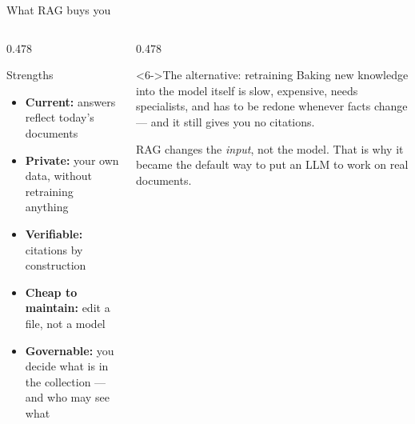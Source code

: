 \documentclass[aspectratio=169,11pt]{beamer}
\begin{document}
\begin{frame}{What RAG buys you}
  \begin{columns}[T,onlytextwidth]
    \begin{column}{0.478\textwidth}
      \begin{exampleblock}{Strengths}
        \begin{itemize}[<+->]
          \item \textbf{Current:} answers reflect today's documents
          \item \textbf{Private:} your own data, without retraining anything
          \item \textbf{Verifiable:} citations by construction
          \item \textbf{Cheap to maintain:} edit a file, not a model
          \item \textbf{Governable:} you decide what is in the collection ---
                and who may see what
        \end{itemize}
      \end{exampleblock}
    \end{column}
    \begin{column}{0.478\textwidth}
      \begin{block}<6->{The alternative: retraining}
        Baking new knowledge into the model itself is slow, expensive,
        needs specialists, and has to be redone whenever facts change ---
        and it still gives you no citations.
        \medskip

        RAG changes the \emph{input}, not the model. That is why it became
        the default way to put an LLM to work on real documents.
      \end{block}
    \end{column}
  \end{columns}
\end{frame}
\end{document}
